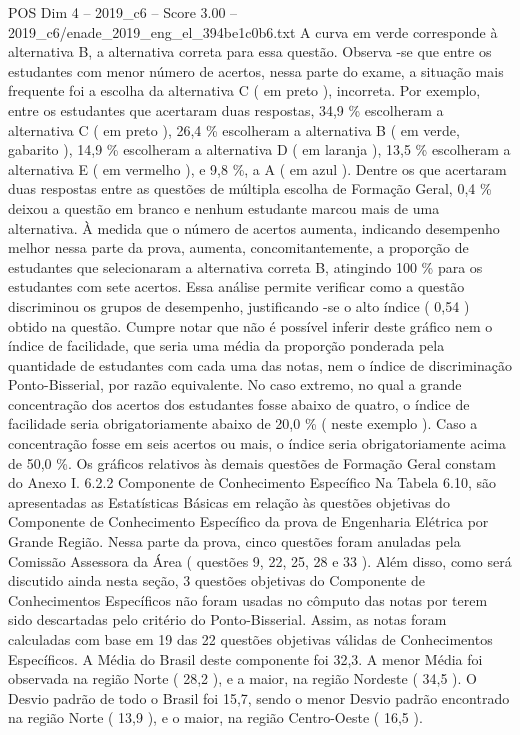 \begin{textsample}{POS Dim 4 – 2019\_c6 – Score 3.00 – 2019\_c6/enade\_2019\_eng\_el\_394be1c0b6.txt}
A curva em verde corresponde à alternativa B, a alternativa correta para essa questão.
Observa -se que entre os estudantes com menor número de acertos, nessa parte do exame, a situação mais frequente foi a escolha da alternativa C ( em preto ), incorreta.
Por exemplo, entre os estudantes que acertaram duas respostas, 34,9 \% escolheram a alternativa C ( em preto ), 26,4 \% escolheram a alternativa B ( em verde, gabarito ), 14,9 \% escolheram a alternativa D ( em laranja ), 13,5 \% escolheram a alternativa E ( em vermelho ), e 9,8 \%, a A ( em azul ).
Dentre os que acertaram duas respostas entre as questões de múltipla escolha de Formação Geral, 0,4 \% deixou a questão em branco e nenhum estudante marcou mais de uma alternativa.
À medida que o número de acertos aumenta, indicando desempenho melhor nessa parte da prova, aumenta, concomitantemente, a proporção de estudantes que selecionaram a alternativa correta B, atingindo 100 \% para os estudantes com sete acertos.
Essa análise permite verificar como a questão discriminou os grupos de desempenho, justificando -se o alto índice ( 0,54 ) obtido na questão.
Cumpre notar que não é possível inferir deste gráfico nem o índice de facilidade, que seria uma média da proporção ponderada pela quantidade de estudantes com cada uma das notas, nem o índice de discriminação Ponto-Bisserial, por razão equivalente.
No caso extremo, no qual a grande concentração dos acertos dos estudantes fosse abaixo de quatro, o índice de facilidade seria obrigatoriamente abaixo de 20,0 \% ( neste exemplo ).
Caso a concentração fosse em seis acertos ou mais, o índice seria obrigatoriamente acima de 50,0 \%.
Os gráficos relativos às demais questões de Formação Geral constam do Anexo I. 6.2.2 Componente de Conhecimento Específico Na Tabela 6.10, são apresentadas as Estatísticas Básicas em relação às questões objetivas do Componente de Conhecimento Específico da prova de Engenharia Elétrica por Grande Região.
Nessa parte da prova, cinco questões foram anuladas pela Comissão Assessora da Área ( questões 9, 22, 25, 28 e 33 ).
Além disso, como será discutido ainda nesta seção, 3 questões objetivas do Componente de Conhecimentos Específicos não foram usadas no cômputo das notas por terem sido descartadas pelo critério do Ponto-Bisserial.
Assim, as notas foram calculadas com base em 19 das 22 questões objetivas válidas de Conhecimentos Específicos.
A Média do Brasil deste componente foi 32,3.
A menor Média foi observada na região Norte ( 28,2 ), e a maior, na região Nordeste ( 34,5 ).
O Desvio padrão de todo o Brasil foi 15,7, sendo o menor Desvio padrão encontrado na região Norte ( 13,9 ), e o maior, na região Centro-Oeste ( 16,5 ).

\end{textsample}
